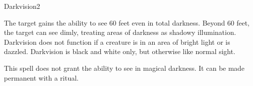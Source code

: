 \begin{spellsection}{Darkvision}{2}
    \begin{spellheader}
    \end{spellheader}
    \begin{spellcontent}
        \begin{spelltargetinginfo}
        \end{spelltargetinginfo}
        \begin{spelleffects}
            \spelleffect The target gains the ability to see 60 feet even in total darkness. Beyond 60 feet, the target can see dimly, treating areas of darkness as shadowy illumination. Darkvision does not function if a creature is in an area of bright light or is dazzled. Darkvision is black and white only, but otherwise like normal sight.
            \spelldur \durlong
        \end{spelleffects}
    \end{spellcontent}
    \begin{spellfooter}
        \spellnotes This spell does not grant the ability to see in magical darkness. It can be made permanent with a  ritual.
        \miscastexplode
    \end{spellfooter}
\end{spellsection}

